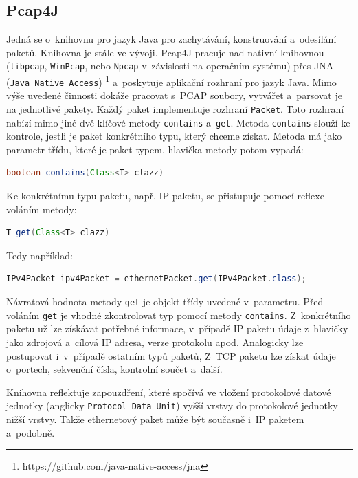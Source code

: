 \subsection{Pcap4J} \label{pcap4j}
Jedná se o~knihovnu pro jazyk Java pro zachytávání, konstruování a~odesílání paketů. Knihovna je stále ve vývoji. Pcap4J pracuje nad nativní knihovnou (\texttt{libpcap}, \texttt{WinPcap}, nebo \texttt{Npcap} v~závislosti na operačním systému) přes JNA (\texttt{Java Native Access})
\footnote{https://github.com/java-native-access/jna}
a~poskytuje aplikační rozhraní pro jazyk Java. Mimo výše uvedené činnosti dokáže pracovat s~PCAP soubory, vytvářet a~parsovat je na jednotlivé pakety. Každý paket implementuje rozhraní \texttt{Packet}. Toto rozhraní nabízí mimo jiné dvě klíčové metody \texttt{contains} a~\texttt{get}. Metoda \texttt{contains} slouží ke kontrole, jestli je paket konkrétního typu, který chceme získat. Metoda má jako parametr třídu, které je paket typem, hlavička metody potom vypadá:

\begin{lstlisting}[language=Java]
    boolean contains(Class<T> clazz)
\end{lstlisting}

\noindent Ke konkrétnímu typu paketu, např. IP paketu, se přistupuje pomocí reflexe voláním metody:

\begin{lstlisting}[language=Java]
    T get(Class<T> clazz)
\end{lstlisting}

\noindent Tedy například:

\begin{lstlisting}[language=Java]
    IPv4Packet ipv4Packet = ethernetPacket.get(IPv4Packet.class);
\end{lstlisting}

\noindent Návratová hodnota metody \texttt{get} je objekt třídy uvedené v~parametru. Před voláním \texttt{get} je vhodné zkontrolovat typ pomocí metody \texttt{contains}. Z~konkrétního paketu už lze získávat potřebné informace, v~případě IP paketu údaje z~hlavičky jako zdrojová a~cílová IP adresa, verze protokolu apod. Analogicky lze postupovat i~v~případě ostatním typů paketů, Z~TCP paketu lze získat údaje o~portech, sekvenční čísla, kontrolní součet a~další.

Knihovna reflektuje zapouzdření, které spočívá ve vložení protokolové datové jednotky (anglicky \texttt{Protocol Data Unit}) vyšší vrstvy do protokolové jednotky nižší vrstvy. Takže ethernetový paket může být současně i~IP paketem a~podobně.

